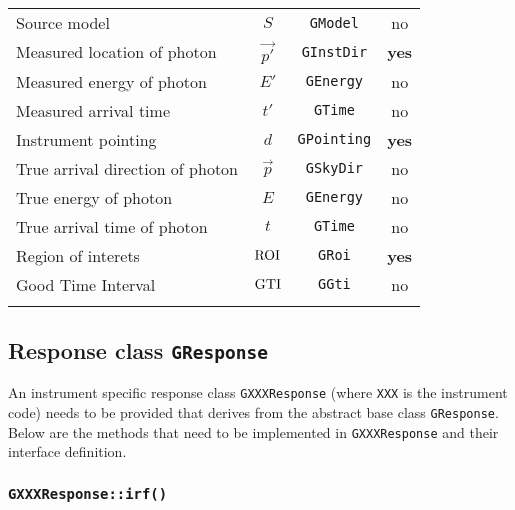 \documentclass{article}[12pt,a4]
\begin{document}
\begin{table}[!h]
\begin{center}
\begin{tabular}{lccc}
Source model & $S$ & {\tt GModel} & no \\ 
Measured location of photon & $\vec{p'}$ & {\tt GInstDir} & {\bf yes} \\
Measured energy of photon & $E'$ & {\tt GEnergy} & no \\
Measured arrival time & $t'$ & {\tt GTime} & no \\
Instrument pointing & $d$ & {\tt GPointing} & {\bf yes} \\
True arrival direction of photon & $\vec{p}$ & {\tt GSkyDir} & no \\
True energy of photon & $E$ & {\tt GEnergy} & no \\
True arrival time of photon & $t$ & {\tt GTime} & no \\
Region of interets & ${\rm ROI}$ & {\tt GRoi} & {\bf yes} \\
Good Time Interval & ${\rm GTI}$ & {\tt GGti} & no \\
\noalign{\smallskip}
\hline
\end{tabular}
\end{center}
\end{table}



\subsection{Response class {\tt GResponse}}

An instrument specific response class {\tt GXXXResponse} (where {\tt XXX} is the instrument code)
needs to be provided that derives from the abstract base class {\tt GResponse}.
Below are the methods that need to be implemented in {\tt GXXXResponse} and their interface
definition.

\subsubsection{{\tt GXXXResponse::irf()}}
\end{document}
